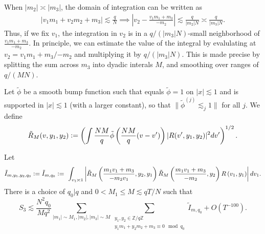 When $|m_2|\asymp|m_3|$, the domain of integration can be written as\begin{align*}
    |v_1m_1+v_2m_2+m_3|\lesssim \frac{q}{N} \implies \left|v_2 - \frac{v_1m_1+m_3}{-m_2}\right|\lesssim \frac{q}{|m_2|N} \asymp \frac{q}{|m_3|N}.
\end{align*}
Thus, if we fix $v_1$, the integration in $v_2$ is in a ${q}/{(|m_3|N)}$-small neighborhood of $\frac{v_1m_1+m_3}{-m_2}$. In principle, we can estimate the value of the integral by evalulating at 
$v_2 = {v_1m_1+m_3}/{-m_2}$ and multiplying it by $q/(|m_3|N)$. This is made precise by splitting the sum across $m_3$ into dyadic interals $M$, and smoothing over ranges of ${q}/{(MN)}$.

Let $\tilde{\phi}$ be a smooth bump function such that equals $\tilde{\phi}=1$ on $|x|\lesssim 1$ and is supported in $|x|\lesssim 1$ (with a larger constant), so that $\|\tilde{\phi}^{(j)}\lesssim_j 1\|$ for all $j$.
We define \[
\tilde{R}_M(v,y_1,y_2) \mathrel{\mathop:}=  \left( \int \frac{NM}{q}\tilde{\phi}\left(\frac{NM}{q}(v-v')\right)|R(v',y_1,y_2)|^2 dv'\right)^{1/2}.
\]
\begin{proposition} \label{dyadics_3}
    Let \[
    \tilde{I}_{m,y_1,y_2,q_0}\mathrel{\mathop:}= \tilde{I}_{m,q_0}\mathrel{\mathop:}= \ \int_{v_1\asymp 1} \left| \tilde{R}_M\left(\frac{m_1v_1+m_3}{-m_2v_1},y_2,y_1\right)
    \tilde{R}_M\left(\frac{m_1v_1+m_3}{-m_2},y_2\right)R\left(v_1,y_1\right)\right| dv_1.
    \]
    There is a choice of $q_0|q$ and $0<M_1\leq M \lesssim qT/N$ such that \[
        S_3\lesssim \frac{N^2q_0}{Mq^2}\sum_{|m_1|\sim M_1,|m_2|,|m_3|\sim M}\sum_{\substack{y_1,y_2 \in\mathbb{Z}/q\mathbb{Z} \\ y_1m_1+y_2m_2+m_3\equiv 0 \mod q_0}}\tilde{I}_{m,q_0}+O(T^{-100}).
    \]
\end{proposition}


